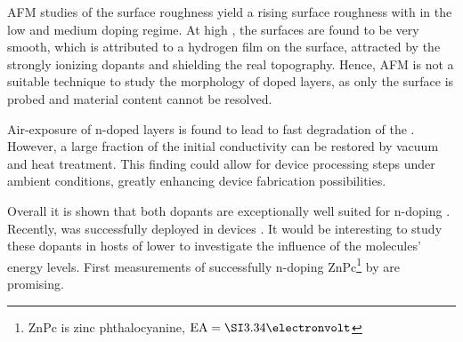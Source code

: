 AFM studies of the surface roughness yield a rising surface roughness with \CLong in the low and medium doping regime. At high \C, the surfaces are found to be very smooth, which is attributed to a hydrogen film on the surface, attracted by the strongly ionizing dopants and shielding the real topography. Hence, AFM is not a suitable technique to study the morphology of doped layers, as only the surface is probed and material content cannot be resolved.

Air-exposure of n-doped layers is found to lead to fast degradation of the \cLong. However, a large fraction of the initial conductivity can be restored by vacuum and heat treatment. This finding could allow for device processing steps under ambient conditions, greatly enhancing device fabrication possibilities.

Overall it is shown that both dopants are exceptionally well suited for n-doping \CS. Recently, \WPd was successfully deployed in devices \cite{Schunemann2012,Fischer2012}. It would be interesting to study these dopants in hosts of lower \EA to investigate the influence of the molecules' energy levels. First measurements of successfully n-doping ZnPc\footnote{ZnPc is zinc phthalocyanine, $\text{EA}=\eV{3.34}$\cite{Gao2001}} by \WPd\cite{Burtone2013} are promising.

